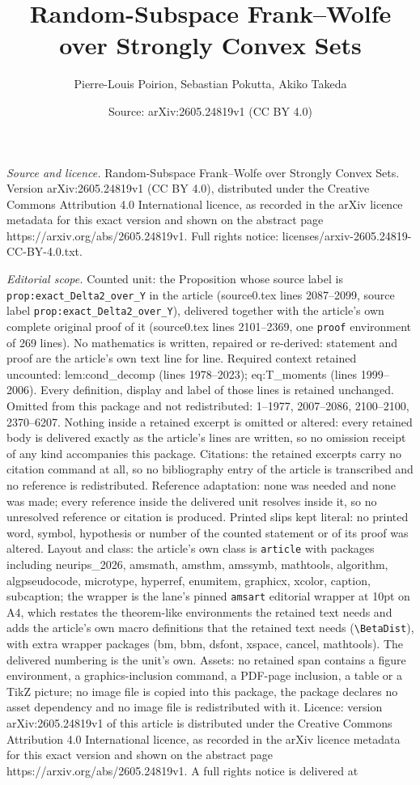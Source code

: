 \documentclass[10pt,a4paper]{amsart}
\title[Random-Subspace Frank--Wolfe over Strongly Convex Sets]{Random-Subspace Frank--Wolfe over Strongly Convex Sets}
\author{Pierre-Louis Poirion, Sebastian Pokutta, Akiko Takeda}
\date{Source: arXiv:2605.24819v1 (CC BY 4.0)}
\begin{document}
\maketitle

\noindent\emph{Source and licence.} Random-Subspace Frank--Wolfe over Strongly Convex Sets. Version arXiv:2605.24819v1 (CC BY 4.0), distributed under the Creative Commons Attribution 4.0 International licence, as recorded in the arXiv licence metadata for this exact version and shown on the abstract page https://arxiv.org/abs/2605.24819v1. Full rights notice: licenses/arxiv-2605.24819-CC-BY-4.0.txt.\par\smallskip

\noindent\textit{Editorial scope.} Counted unit: the Proposition whose source label is \texttt{prop:exact\_Delta2\_over\_Y} in the article (source0.tex lines 2087--2099, source label \texttt{prop:exact\_Delta2\_over\_Y}), delivered together with the article's own complete original proof of it (source0.tex lines 2101--2369, one \texttt{proof} environment of 269 lines). No mathematics is written, repaired or re-derived: statement and proof are the article's own text line for line. Required context retained uncounted: lem:cond\_decomp (lines 1978--2023); eq:T\_moments (lines 1999--2006). Every definition, display and label of those lines is retained unchanged. Omitted from this package and not redistributed: 1--1977, 2007--2086, 2100--2100, 2370--6207. Nothing inside a retained excerpt is omitted or altered: every retained body is delivered exactly as the article's lines are written, so no omission receipt of any kind accompanies this package. Citations: the retained excerpts carry no citation command at all, so no bibliography entry of the article is transcribed and no reference is redistributed. Reference adaptation: none was needed and none was made; every reference inside the delivered unit resolves inside it, so no unresolved reference or citation is produced. Printed slips kept literal: no printed word, symbol, hypothesis or number of the counted statement or of its proof was altered. Layout and class: the article's own class is \texttt{article} with packages including neurips\_2026, amsmath, amsthm, amssymb, mathtools, algorithm, algpseudocode, microtype, hyperref, enumitem, graphicx, xcolor, caption, subcaption; the wrapper is the lane's pinned \texttt{amsart} editorial wrapper at 10pt on A4, which restates the theorem-like environments the retained text needs and adds the article's own macro definitions that the retained text needs (\texttt{\textbackslash BetaDist}), with extra wrapper packages (bm, bbm, dsfont, xspace, cancel, mathtools). The delivered numbering is the unit's own. Assets: no retained span contains a figure environment, a graphics-inclusion command, a PDF-page inclusion, a table or a TikZ picture; no image file is copied into this package, the package declares no asset dependency and no image file is redistributed with it. Licence: version arXiv:2605.24819v1 of this article is distributed under the Creative Commons Attribution 4.0 International licence, as recorded in the arXiv licence metadata for this exact version and shown on the abstract page https://arxiv.org/abs/2605.24819v1. A full rights notice is delivered at 
\end{document}
